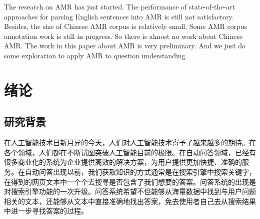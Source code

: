 \documentclass[master, winfont]{njuthesis}
\begin{document}
\begin{englishabstract}
The research on AMR has just started. The performance of state-of-the-art approaches for parsing English sentences into AMR is still not satisfactory. Besides, the size of Chinese AMR corpus is relatively small. Some AMR corpus annotation work is still in progress. So there is almost no work about Chinese AMR. The work in this paper about AMR is very preliminary. And we just do some exploration to apply AMR to question understanding.

\end{englishabstract}

%
%

\tableofcontents

\listoffigures

\listoftables

\mainmatter

\chapter{绪论}\label{chapter_introduction}
\section{研究背景}
在人工智能技术日新月异的今天，人们对人工智能技术寄予了越来越多的期待。在各个领域，人们都在不断试图突破人工智能目前的极限。在自动问答领域，已经有很多商业化的系统为企业提供高效的解决方案，为用户提供更加快捷、准确的服务。在自动问答出现以前，我们获取知识的方式通常是在搜索引擎中搜索关键字，在得到的网页文本中一个个去搜寻是否包含了我们想要的答案。问答系统的出现是对搜索引擎功能的一次升级。问答系统希望不但能够从海量数据中找到与用户问题相关的文本，还能够从文本中直接准确地找出答案，免去使用者自己去从搜索结果中进一步寻找答案的过程。
\end{document}
